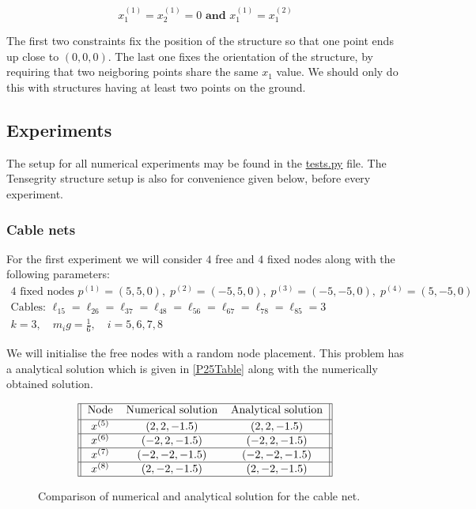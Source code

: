 \begin{equation}
    x_{1}^{(1)} = x_{2}^{(1)} = 0 \textbf{ and } x_{1}^{(1)} = x_{1}^{(2)}
\end{equation}

The first two constraints fix the position of the structure so that one point ends up close to $(0, 0, 0)$. The last one fixes the orientation of the structure, by requiring that two neigboring points share the same $x_1$ value. We should only do this with structures having at least two points on the ground. 
 
\subsection{Experiments}\label{sec:experiments}
The setup for all numerical experiments may be found in the \href{https://github.com/otkulseng/Opt1_Project/blob/main/Kode/tests.py}{tests.py} file. The Tensegrity structure setup is also for convenience given below, before every experiment.
\subsubsection{Cable nets}
For the first experiment we will consider $4$ free and $4$ fixed nodes along with the following parameters:
\begin{equation*}
\begin{gathered}
    4 \text{ fixed nodes } p^{(1)} = (5,5,0),\; p^{(2)} = (-5,5,0),\; p^{(3)} = (-5,-5,0),\; p^{(4)} = (5,-5,0) \\
    \text{Cables: } \ell_{15} = \ell_{26} = \ell_{37} = \ell_{48} = \ell_{56} = \ell_{67} = \ell_{78} = \ell_{85} = 3\\ 
    k = 3, \quad m_i g = \frac{1}{6}, \quad i= 5,6,7,8 
\end{gathered}
\end{equation*}

We will initialise the free nodes with a random node placement. This problem has a analytical solution which is given in \eqref{P25Table} along with the numerically obtained solution. 

\begin{figure}    
\caption{Comparison of numerical and analytical solution for the cable net.}
\label{P25Table}
\begin{gather}
\begin{tabular}{||c c c||} 
    \hline
    Node & Numerical solution & Analytical solution \\ [0.5ex] 
    \hline
    $x^{(5)}$ & $(2,2,-1.5)$ & $(2,2,-1.5)$  \\ 
    \hline
    $x^{(6)}$ & $(-2,2,-1.5)$& $(-2,2,-1.5)$  \\ 
    \hline
    $x^{(7)}$ & $(-2,-2,-1.5)$ & $(-2,-2,-1.5)$\\ 
    \hline
    $x^{(8)}$ & $(2,-2,-1.5)$ & $(2,-2,-1.5)$ \\ 
    \hline
\end{tabular}
\end{gather}
\end{figure}



